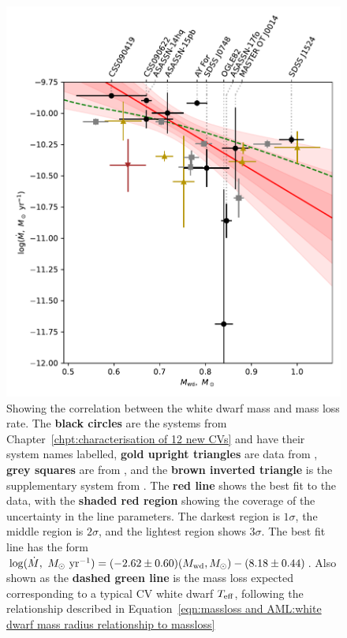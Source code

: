 \begin{figure}
    \centering
    \includegraphics[width=\textwidth]{figures/results/Mdot/Mwd_Mdot.pdf}
    \caption{Showing the correlation between the white dwarf mass and mass loss rate. The {\bf black circles} are the systems from Chapter~\ref{chpt:characterisation of 12 new CVs} and have their system names labelled, {\bf gold upright triangles} are data from \citet{McAllister2019}, {\bf grey squares} are from \citet{Savoury2011}, and the {\bf brown inverted triangle} is the supplementary system from \citet{mcallister2017b}. The {\bf red line} shows the best fit to the data, with the {\bf shaded red region} showing the coverage of the uncertainty in the line parameters. The darkest region is $1\sigma$, the middle region is $2\sigma$, and the lightest region shows $3\sigma$. The best fit line has the form $\log ( \dot M,\ M_\odot\ {\rm yr}^{-1}) = (-2.62 \pm 0.60) (M_{\rm wd}, M_\odot) - (8.18 \pm 0.44)$. Also shown as the {\bf dashed green line} is the mass loss expected corresponding to a typical CV white dwarf $T_{\rm eff}$, following the relationship described in Equation~\ref{eqn:massloss and AML:white dwarf mass radius relationship to massloss}}
    \label{fig:massloss and AML:white dwarf mass vs Mdot fit}
\end{figure}
